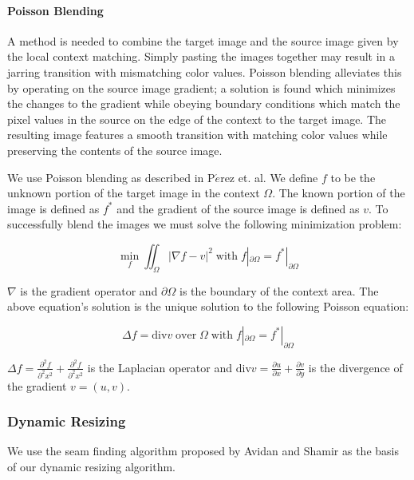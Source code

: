 \documentclass[11pt]{amsart}
\begin{document}
\paragraph{\sc Poisson Blending}



A method is needed to combine the target image and the source image given by the local context matching. Simply pasting the images together may result in a jarring transition with mismatching color values. Poisson blending alleviates this by operating on the source image gradient; a solution is found which minimizes the changes to the gradient while obeying boundary conditions which match the pixel values in the source on the edge of the context to the target image. The resulting image features a smooth transition with matching color values while preserving the contents of the source image.


We use Poisson blending as described in P$\acute{e}$rez et. al. \cite{Perez:2003} We define $f$ to be the unknown portion of the target image in the context $\Omega$. The known portion of the image is defined as $f^\ast$ and the gradient of the source image is defined as $v$. To successfully blend the images we must solve the following minimization problem:

$$ 
\min_f \iint_\Omega|\nabla f-v|^{2} \;\mathrm{with}\; f|_{\partial\Omega} = f^{\ast}|_{\partial\Omega} 
$$

$\nabla$ is the gradient operator and $\partial\Omega$ is the boundary of the context area. The above equation's solution is the unique solution to the following Poisson equation:

$$
\Delta f=\mathrm{div} v\;\mathrm{ over }\;\Omega\;\mathrm{  with}\;  f|_{\partial\Omega} = f^{\ast}|_{\partial\Omega}
$$

$\Delta f = \frac{\partial^{2} f}{\partial^{2}x^2}+\frac{\partial^{2}f}{\partial^{2}x^2}$ is the Laplacian operator and $\mathrm{div} v = \frac{\partial u}{\partial x}+\frac{\partial v}{\partial y}$ is the divergence of the gradient $v=(u,v)$.


\subsubsection{Dynamic Resizing}

We use the seam finding algorithm proposed by Avidan and Shamir \cite{Avidan:2007} as the basis of our dynamic resizing algorithm. 
\end{document}

